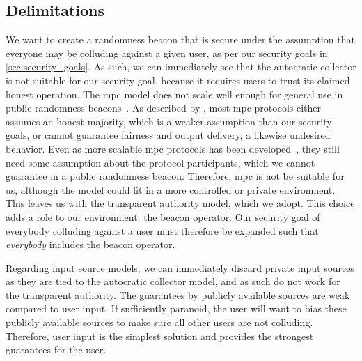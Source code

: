 \subsection{Delimitations}%
\label{sub:delimitations}
We want to create a randomness beacon that is secure under the assumption that everyone may be colluding against a given user, as per our security goals in \cref{sec:security_goals}.
As such, we can immediately see that the autocratic collector is not suitable for our security goal, because it requires users to trust its claimed honest operation.
The \gls{mpc} model does not scale well enough for general use in public randomness beacons~\cite{syta2017scalable}.
As described by \citet{damgaard2006scalable},  most \gls{mpc} protocols either assumes an honest majority, which is a weaker assumption than our security goals, or cannot guarantee fairness and output delivery, a likewise undesired behavior.
Even as more scalable \gls{mpc} protocols has been developed~\cite{damgaard2006scalable},  they still need some assumption  about the protocol participants, which we cannot guarantee in a public randomness beacon.
Therefore, \gls{mpc} is not be suitable for us, although the model could fit in a more controlled or private environment.
This leaves us with the transparent authority model, which we adopt.
This choice adds a role to our environment: the beacon operator. Our security goal of everybody colluding against a user must therefore be expanded such that \emph{everybody} includes the beacon operator.

Regarding input source models, we can immediately discard private input sources as they are tied to the autocratic collector model, and as such do not work for the transparent authority.
The guarantees by publicly available sources are weak compared to user input.
If sufficiently paranoid, the user will want to bias these publicly available sources to make sure all other users are not colluding.
Therefore, user input is the simplest solution and provides the strongest guarantees for the user.
